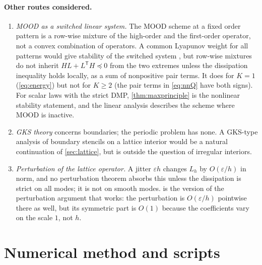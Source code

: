 \documentclass[11pt,a4paper]{article}
\theoremstyle{plain}
\theoremstyle{definition}
\theoremstyle{remark}
\numberwithin{equation}{section}
\begin{document}
\paragraph{Other routes considered.}
\begin{enumerate}[label=(\arabic*)]
\item \emph{MOOD as a switched linear system.} The MOOD scheme at a fixed order pattern is a row-wise mixture of the high-order and the first-order operator, not a convex combination of operators. A common Lyapunov weight for all patterns would give stability of the switched system \cite{Liberzon1999}, but row-wise mixtures do not inherit $HL+L^{\mathsf T}H\preceq0$ from the two extremes unless the dissipation inequality holds locally, as a sum of nonpositive pair terms. It does for $K=1$ (\eqref{eq:energy}) but not for $K\ge2$ (the pair terms in \eqref{eq:nnQ} have both signs). For scalar laws with the strict DMP, \cref{thm:maxprinciple} is the nonlinear stability statement, and the linear analysis describes the scheme where MOOD is inactive.
\item \emph{GKS theory} concerns boundaries; the periodic problem has none. A GKS-type analysis of boundary stencils on a lattice interior would be a natural continuation of \cref{sec:lattice}, but is outside the question of irregular interiors.
\item \emph{Perturbation of the lattice operator.} A jitter $\varepsilon h$ changes $L_h$ by $O(\varepsilon/h)$ in norm, and no perturbation theorem absorbs this unless the dissipation is strict on all modes; it is not on smooth modes.  is the version of the perturbation argument that works: the perturbation is $O(\varepsilon/h)$ pointwise there as well, but its symmetric part is $O(1)$ because the coefficients vary on the scale $1$, not $h$.
\end{enumerate}

\appendix
\section{Numerical method and scripts}\label{app:code}
\end{document}
